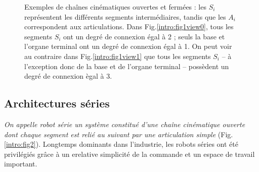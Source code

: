 \begin{figure}[!ht]
  \centering
\hfill
    \caption{\footnotesize{Exemples de cha\^ines cinématiques ouvertes et 
fermées : les $S_i$ représentent les différents segments intermédiaires, tandis 
que les $A_i$ correspondent aux articulations. Dans Fig.\ref{intro:fig1view0}, 
tous les segments $S_i$ ont un degré de connexion égal à 2 ; seuls la base et 
l'organe terminal ont un degré de connexion égal à 1. On peut voir au 
contraire dans Fig.\ref{intro:fig1view1} que tous les segments $S_i$ -- \`a 
l'exception donc de la base et de l'organe terminal -- possèdent un degré de 
connexion ègal à 3.}}
\label{intro:fig1}
\end{figure}

\subsection{Architectures séries} \label{chap0-0-1}

{\it On appelle robot série un système constitué d'une chaîne cinématique 
ouverte dont chaque segment est relié au suivant par une articulation simple} 
(Fig.\ref{intro:fig2}). Longtemps dominants dans l'industrie, les robots séries 
ont été privilégiés grâce à un erelative simplicité de la commande et un espace 
de travail important.

